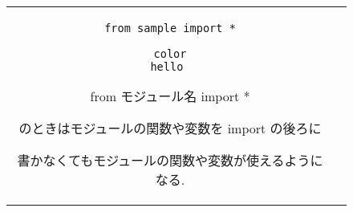 \documentclass{jsarticle}
\begin{document}
\begin{figure}[h]
	\begin{tabular}{cc}
		\begin{minipage}[t]{.4\textwidth}
			\begin{lstlisting}[caption=インポートの仕方-その4]
from sample import *

color
hello \end{lstlisting}
		\end{minipage} \hspace{5mm}
		\begin{minipage}[t]{.6\textwidth}
			\begin{screen}
				from モジュール名 import * \par
				のときはモジュールの関数や変数を import の後ろに\par 書かなくてもモジュールの関数や変数が使えるようになる.
			\end{screen}
		\end{minipage}
	\end{tabular}
\end{figure}


\end{document}
